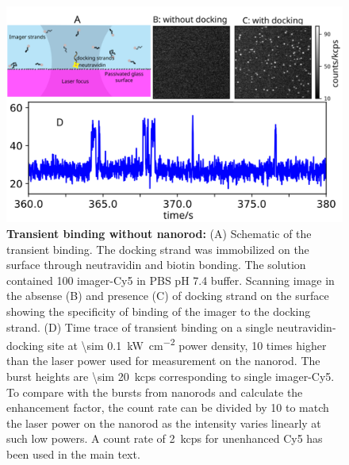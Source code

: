 \begin{figure}[ht]
  \centering
  \includegraphics[width=\textwidth]{timetrace_only_Cy5}
  \makeatletter
  \renewcommand{\fnum@figure}{\figurename~S\thefigure}
  \makeatother
  \caption{\textbf{Transient binding without nanorod:} (A) Schematic of the transient binding.
  The docking strand was immobilized on the surface through neutravidin and biotin bonding.
  The solution contained \SI{100}{\nM} imager-Cy5 in PBS pH 7.4 buffer.
  Scanning image  in the absense (B) and presence (C) of docking strand on the surface showing the specificity of binding of the imager to the docking strand.
  (D) Time trace of transient binding on a single neutravidin-docking site at \SI{\sim 0.1}{\kW\per\cm\squared} power density, 10 times higher than the laser power used for measurement on the nanorod. The burst heights are \SI{\sim 20}{ kcps} corresponding to single imager-Cy5.
  To compare with the bursts from nanorods and calculate the enhancement factor, the count rate can be divided by 10 to match the laser power on the nanorod as the intensity varies linearly at such low powers.
  A count rate of \SI{2}{ kcps} for unenhanced Cy5 has been used in the main text. 
  }
  \label{SIfig:timetrace_only_Cy5}
\end{figure}
